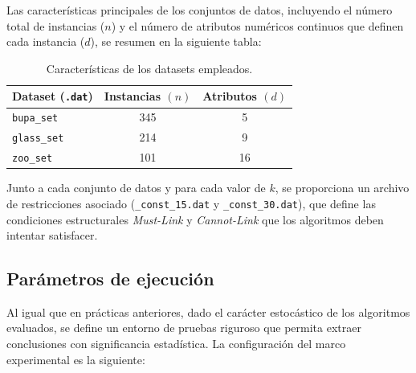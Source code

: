 \documentclass[a4paper,12pt]{article}%
\begin{document}
Las características principales de los conjuntos de datos, incluyendo el número total de instancias ($n$) y el número de atributos numéricos continuos que definen cada instancia ($d$), se resumen en la siguiente tabla:

\begin{table}[h!]
	\centering
	\begin{tabular}{|l|c|c|}
		\hline
		\textbf{Dataset} (\texttt{.dat}) & \textbf{Instancias $(n)$} & \textbf{Atributos $(d)$} \\ \hline
		\texttt{bupa\_set} & 345 & 5 \\ \hline
		\texttt{glass\_set} & 214 & 9 \\ \hline
		\texttt{zoo\_set} & 101 & 16 \\ \hline
	\end{tabular}
	\caption{Características de los datasets empleados.}
	\label{tab:datasets}
\end{table}

Junto a cada conjunto de datos y para cada valor de $k$, se proporciona un archivo de restricciones asociado (\texttt{\_const\_15.dat} y \texttt{\_const\_30.dat}), que define las condiciones estructurales \textit{Must-Link} y \textit{Cannot-Link} que los algoritmos deben intentar satisfacer.


\subsection{Parámetros de ejecución}

\noindent Al igual que en prácticas anteriores, dado el carácter estocástico de los algoritmos evaluados, se define un entorno de pruebas riguroso que permita extraer conclusiones con significancia estadística. La configuración del marco experimental es la siguiente:
\end{document}
